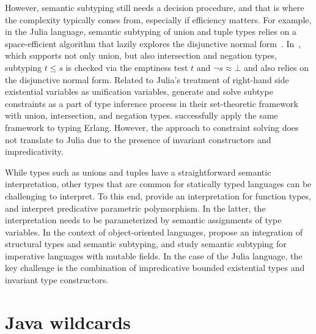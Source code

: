 However, semantic subtyping still needs a decision procedure, and that is where
the complexity typically comes from, especially if efficiency matters.
For example, in the Julia language, semantic subtyping of union and tuple types
relies on a space-efficient algorithm that lazily explores the disjunctive
normal form~\cite{bib:chung:julia-sub-algo:2019}.
In~\cite{bib:frisch:sem-sub:2002}, which supports not only union, but also
intersection and negation types, subtyping $t \leq s$ is checked via
the emptiness test $t \text{ and } \lnot s \approx \bot$ and also relies on
the disjunctive normal form.
Related to Julia's treatment of right-hand side existential variables as 
unification variables, \citet{bib:castagna:sem-poly-inf:2015} generate and solve
subtype constraints as a part of type inference process in their set-theoretic
framework with union, intersection, and negation types.
\citet{bib:schimpf:set-types-erlang:2023} successfully apply the
same framework to typing Erlang.
However, the approach to constraint solving does not translate to Julia
due to the presence of invariant constructors and impredicativity.

While types such as unions and tuples have a straightforward
semantic interpretation, other types that are common for statically typed
languages can be challenging to interpret.
To this end, \citet{bib:frisch:sem-sub:2002} provide an interpretation for
function types, and \citet{bib:castagna:sem-poly:2011} interpret predicative
parametric polymorphism. In the latter, the interpretation needs to be
parameterized by semantic assignments of type variables.
In the context of object-oriented languages,
\citet{bib:dardha:sem-sub-obj:2016} propose an integration of structural types and
semantic subtyping, and \citet{bib:ancona:sem-sub-imp:2016} study semantic
subtyping for imperative languages with mutable fields.
In the case of the Julia language, %
the key challenge is the combination of
impredicative bounded existential types and invariant type constructors.

\section{Java wildcards}

